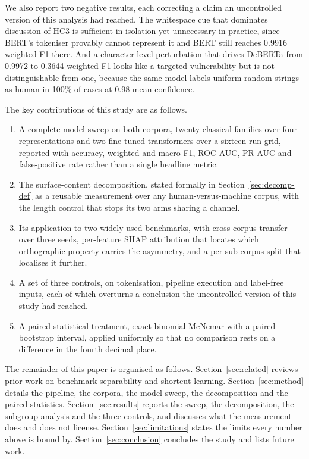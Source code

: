 \documentclass[conference,a4paper]{IEEEtran}
\begin{document}
We also report two negative results, each correcting a claim an uncontrolled version of this analysis had reached. The whitespace cue that dominates discussion of HC3 is sufficient in isolation yet unnecessary in practice, since BERT's tokeniser provably cannot represent it and BERT still reaches 0.9916 weighted F1 there. And a character-level perturbation that drives DeBERTa from 0.9972 to 0.3644 weighted F1 looks like a targeted vulnerability but is not distinguishable from one, because the same model labels uniform random strings as human in 100\% of cases at 0.98 mean confidence.

The key contributions of this study are as follows.
\begin{enumerate}
    \item A complete model sweep on both corpora, twenty classical families over four representations and two fine-tuned transformers over a sixteen-run grid, reported with accuracy, weighted and macro F1, ROC-AUC, PR-AUC and false-positive rate rather than a single headline metric.
    \item The surface-content decomposition, stated formally in Section~\ref{sec:decomp-def} as a reusable measurement over any human-versus-machine corpus, with the length control that stops its two arms sharing a channel.
    \item Its application to two widely used benchmarks, with cross-corpus transfer over three seeds, per-feature SHAP attribution that locates which orthographic property carries the asymmetry, and a per-sub-corpus split that localises it further.
    \item A set of three controls, on tokenisation, pipeline execution and label-free inputs, each of which overturns a conclusion the uncontrolled version of this study had reached.
    \item A paired statistical treatment, exact-binomial McNemar with a paired bootstrap interval, applied uniformly so that no comparison rests on a difference in the fourth decimal place.
\end{enumerate}

The remainder of this paper is organised as follows. Section~\ref{sec:related} reviews prior work on benchmark separability and shortcut learning. Section~\ref{sec:method} details the pipeline, the corpora, the model sweep, the decomposition and the paired statistics. Section~\ref{sec:results} reports the sweep, the decomposition, the subgroup analysis and the three controls, and discusses what the measurement does and does not license. Section~\ref{sec:limitations} states the limits every number above is bound by. Section~\ref{sec:conclusion} concludes the study and lists future work.
\end{document}
